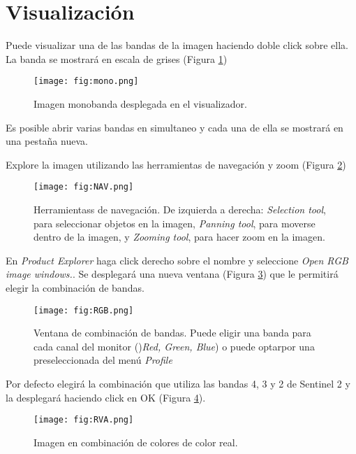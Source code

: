 \section{Visualización}

Puede visualizar una de las bandas de la imagen haciendo doble click sobre ella. La banda se mostrará en escala de grises (Figura \ref{fig:mono})

\begin{figure}[h!]
    \centering
    \texttt{[image: fig:mono.png]}
    \caption{Imagen monobanda desplegada en el visualizador.}
    \label{fig:mono}
\end{figure}

Es posible abrir varias bandas en simultaneo y cada una de ella se mostrará en una pestaña nueva.

Explore la imagen utilizando las herramientas de navegación y zoom (Figura \ref{fig:NAV})

\begin{figure}[h!]
    \centering
    \texttt{[image: fig:NAV.png]}
    \caption{Herramientass de navegación. De izquierda a derecha: \emph{Selection tool}, para seleccionar objetos en la imagen, \emph{Panning tool}, para moverse dentro de la imagen, y \emph{Zooming tool}, para hacer zoom en la imagen.}
    \label{fig:NAV}
\end{figure}

En \emph{Product Explorer} haga click derecho sobre el nombre y seleccione \emph{Open RGB image windows.}. Se desplegará una nueva ventana (Figura \ref{fig:RGB}) que le permitirá elegir la combinación de bandas.

\begin{figure}[h!]
    \centering
    \texttt{[image: fig:RGB.png]}
    \caption{Ventana de combinación de bandas. Puede eligir una banda para cada canal del monitor ()\emph{Red, Green, Blue}) o puede optarpor una preseleccionada del menú \emph{Profile}}
    \label{fig:RGB}
\end{figure}

Por defecto elegirá la combinación que utiliza las bandas 4, 3 y 2 de Sentinel 2 y la desplegará haciendo click en OK (Figura \ref{fig:RVA}).

\begin{figure}[h!]
    \centering
    \texttt{[image: fig:RVA.png]}
    \caption{Imagen en combinación de colores de color real.}
    \label{fig:RVA}
\end{figure}



